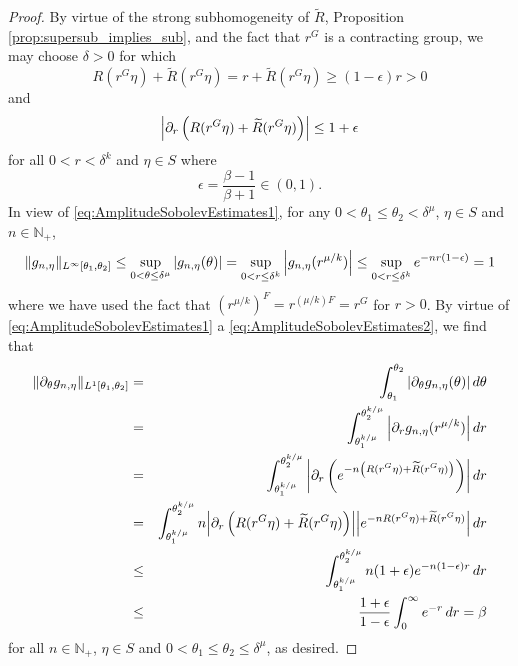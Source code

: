 \documentclass[11pt]{article}
\theoremstyle{remark}
\newcommand{\p}{\partial}
\begin{document}
\begin{proof}
By virtue of the strong subhomogeneity of $\widetilde{R}$, Proposition \ref{prop:supersub_implies_sub}, and the fact that $r^G$ is a contracting group, we may choose $\delta>0$ for which 
\begin{equation}\label{eq:AmplitudeSobolevEstimates1}
    R(r^G\eta)+\widetilde{R}\left(r^G\eta\right)=r+\widetilde{R}\left(r^G\eta\right)\geq (1-\epsilon)r>0
\end{equation}
and
\begin{equation}\label{eq:AmplitudeSobolevEstimates2}
    \abs{\partial_r\left(R(r^G\eta)+\widetilde{R}(r^G\eta)\right)}\leq 1+\epsilon
\end{equation}
for all $0<r<\delta^k$ and $\eta\in S$ where
\begin{equation*}
    \epsilon=\frac{\beta-1}{\beta+1}\in(0,1).
\end{equation*}
In view of \eqref{eq:AmplitudeSobolevEstimates1}, for any $0<\theta_1\leq\theta_2<\delta^{\mu}$, $\eta\in S$ and $n\in\mathbb{N}_+$,
\begin{equation*}
\|g_{n,\eta}\|_{L^\infty[\theta_1,\theta_2]}\leq\sup_{0<\theta\leq\delta^{\mu}}\abs{g_{n,\eta}(\theta)}=\sup_{0<r\leq\delta^k}\abs{g_{n,\eta}(r^{\mu/k})}\leq \sup_{0<r\leq \delta^k}e^{-nr(1-\epsilon)}= 1
\end{equation*}
where we have used the fact that $(r^{\mu/k})^F=r^{(\mu/k)F}=r^G$ for $r>0$. By virtue of \eqref{eq:AmplitudeSobolevEstimates1} a \eqref{eq:AmplitudeSobolevEstimates2}, we find that
\begin{eqnarray*}
\|\partial_{\theta}g_{n,\eta}\|_{L^1[\theta_1,\theta_2]}
&=&\int_{\theta_1}^{\theta_2}\abs{\p_\theta g_{n,\eta}(\theta)}\,d\theta\\
&=&\int_{\theta_1^{k/\mu}}^{\theta_2^{k/\mu}}\abs{\p_r g_{n,\eta}(r^{\mu/k})}\,dr\\
&=&\int_{\theta_1^{k/\mu}}^{\theta_2^{k/\mu}}\abs{\p_r \left(e^{-n\left(R(r^G\eta)+\widetilde{R}(r^G\eta)\right)}\right) }\,dr\\
&=&\int_{\theta_1^{k/\mu}}^{\theta_2^{k/\mu}}n\abs{\partial_r\left(R(r^G\eta)+\widetilde{R}(r^G\eta)\right)}\abs{e^{-nR(r^G\eta)+\widetilde{R}(r^G\eta)}}\,dr\\
&\leq&\int_{\theta_1^{k/\mu}}^{\theta_2^{k/\mu}}n(1+\epsilon)e^{-n(1-\epsilon)r}\,dr\\
&\leq &\frac{1+\epsilon}{1-\epsilon}\int_0^\infty e^{-r}\,dr=\beta
\end{eqnarray*}
for all $n\in\mathbb{N}_+$, $\eta\in S$ and $0<\theta_1\leq\theta_2\leq\delta^{\mu}$, as desired.
\end{proof}
\end{document}
